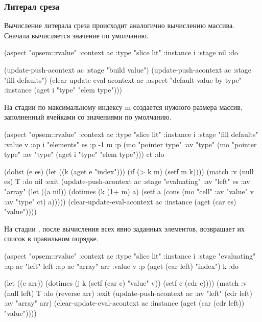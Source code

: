 \documentclass[12pt,twoside,russian]{article}
\newcommand{\textABMLString}[1]{{\color{abmlString}#1}}
\newcommand{\ABMLString}[1]{\abmlinline{\textABMLString{#1}}}
\begin{document}
\subsubsection{Литерал среза}
Вычисление литерала среза происходит аналогично вычислению массива. Сначала вычисляется значение по умолчанию.

\begin{ABMLCode}
(aspect "opsem::rvalue" :context ac :type "slice lit" :instance i 
  :stage nil :do 

  (update-push-acontext ac :stage "build value")
  (update-push-acontext ac :stage "fill defaults")
  (clear-update-eval-acontext ac :aspect "default value by type" 
    :instance (aget i "type" "elem type")))
\end{ABMLCode}

На стадии \ABMLString{fill defaults} по максимальному индексу m создается нужного размера массив, заполненный ячейками со значениями по умолчанию.

\begin{ABMLCode}
(aspect "opsem::rvalue" :context ac :type "slice lit" :instance i 
  :stage "fill defaults" :value v :ap i "elements" es :p -1 m 
  :p (mo "pointer type" :av "type" (mo "pointer type" 
  :av "type" (aget i "type" "elem type"))) ct :do 
    
  (dolist (e es) (let ((k (aget e "index"))) (if (> k m) (setf m k))))
  (match :v (null es) T 
  :do nil
  :exit (update-push-acontext ac :stage "evaluating" :av "left" es 
          :av "array" (let ((a nil)) (dotimes (k (1+ m) a) 
          (setf a (cons (mo "cell" :av "value" v :av "type" ct) a)))))
        (clear-update-eval-acontext ac 
          :instance (aget (car es) "value"))))
\end{ABMLCode}

На стадии \ABMLString{evaluating}, после вычисления всех явно заданных элементов, возвращает их список в правильном порядке.

\begin{ABMLCode}
(aspect "opsem::rvalue" :context ac :type "slice lit" :instance i 
  :stage "evaluating" :ap ac "left" left :ap ac "array" arr 
  :value v :p (aget (car left) "index") k :do 
    
  (let ((c arr)) 
    (dotimes (j k (setf (car c) "value" v)) (setf c (cdr c))))
  (match :v (null left) T 
  :do (reverse arr) 
  :exit (update-push-acontext ac :av "left" (cdr left) :av "array" arr)
        (clear-update-eval-acontext ac 
          :instance (aget (car (cdr left)) "value"))))
\end{ABMLCode}
\end{document}
